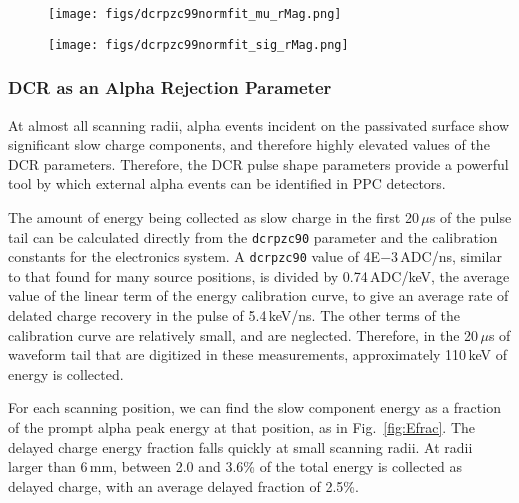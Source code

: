 \documentclass[groupedaddress,rmp,amsmath,amssymb,bibnotes,altaffilletter,twocolumn]{revtex4-1}
\begin{document}
\begin{figure*}[]
 \centering
 \begin{subfigure}[]{.45\textwidth}
 \texttt{[image: figs/dcrpzc99normfit\_mu\_rMag.png]}
\end{subfigure}
 \begin{subfigure}[]{.45\textwidth}
 \texttt{[image: figs/dcrpzc99normfit\_sig\_rMag.png]}
\end{subfigure}
 \caption{The centroids {\it (left)} and standard deviations {\it (right)} of the alpha {\tt dcrpzc99norm} peaks in each data set, given as a function of the radial distract from the point contact. The centroids of the 0$\degree$ and 180$\degree$ scans are not consistent with other another at $r>12$\,mm, but the peak widths appear relatively consistent. See~\ref{sssec:DCRfit_disc} for discussion.} 
 \label{fig:dcrNormFit_rMag}
\end{figure*}

\subsubsection{DCR as an Alpha Rejection Parameter}\label{sssec:DCRfit_disc}
At almost all scanning radii, alpha events incident on the passivated surface show significant slow charge components, and therefore highly elevated values of the DCR parameters. Therefore, the DCR pulse shape parameters provide a powerful tool by which external alpha events can be identified in PPC detectors. 

The amount of energy being collected as slow charge in the first 20\,$\mu$s of the pulse tail can be calculated directly from the {\tt dcrpzc90} parameter and the calibration constants for the electronics system. A {\tt dcrpzc90} value of 4E$-3$\,ADC/ns, similar to that found for many source positions, is divided by 0.74\,ADC/keV, the average value of the linear term of the energy calibration curve, to give an average rate of delated charge recovery in the pulse of 5.4\,keV/ns. The other terms of the calibration curve are relatively small, and are neglected. Therefore, in the 20\,$\mu$s of waveform tail that are digitized in these measurements, approximately 110\,keV of energy is collected. 

For each scanning position, we can find the slow component energy as a fraction of the prompt alpha peak energy at that position, as in Fig.~\ref{fig:Efrac}. The delayed charge energy fraction falls quickly at small scanning radii. At radii larger than 6\,mm, between 2.0 and 3.6\% of the total energy is collected as delayed charge, with an average delayed fraction of 2.5\%.  
\end{document}
